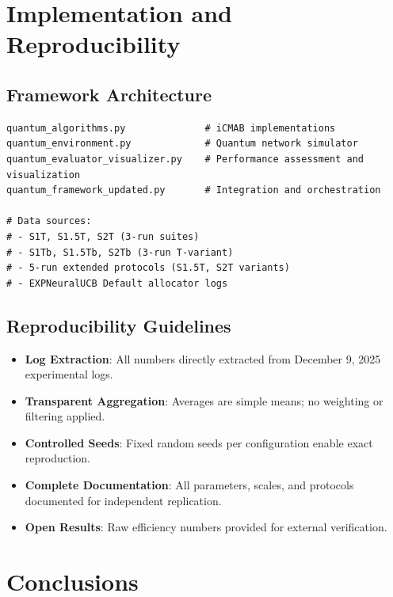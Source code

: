 \documentclass[12pt,a4paper]{article}
\begin{document}
\section{Implementation and Reproducibility}

\subsection{Framework Architecture}
\begin{lstlisting}[caption=Core iCMAB Framework Components]
quantum_algorithms.py              # iCMAB implementations
quantum_environment.py             # Quantum network simulator
quantum_evaluator_visualizer.py    # Performance assessment and visualization
quantum_framework_updated.py       # Integration and orchestration

# Data sources:
# - S1T, S1.5T, S2T (3-run suites)
# - S1Tb, S1.5Tb, S2Tb (3-run T-variant)
# - 5-run extended protocols (S1.5T, S2T variants)
# - EXPNeuralUCB Default allocator logs
\end{lstlisting}

\subsection{Reproducibility Guidelines}
\begin{itemize}
\item \textbf{Log Extraction}: All numbers directly extracted from December 9, 2025 experimental logs.
\item \textbf{Transparent Aggregation}: Averages are simple means; no weighting or filtering applied.
\item \textbf{Controlled Seeds}: Fixed random seeds per configuration enable exact reproduction.
\item \textbf{Complete Documentation}: All parameters, scales, and protocols documented for independent replication.
\item \textbf{Open Results}: Raw efficiency numbers provided for external verification.
\end{itemize}

\newpage
\section{Conclusions}
\end{document}
